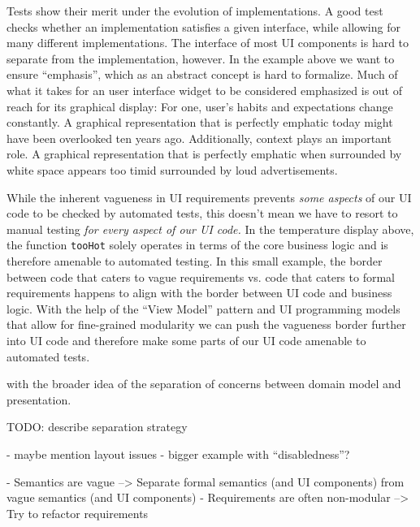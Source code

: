 \documentclass[sigplan,screen]{acmart}
\begin{document}
Tests show their merit under the evolution of implementations. A good
test checks whether an implementation satisfies a given interface,
while allowing for many different implementations. The interface of
most UI components is hard to separate from the implementation,
however. In the example above we want to ensure ``emphasis'', which as
an abstract concept is hard to formalize. Much of what it takes for an
user interface widget to be considered emphasized is out of reach for
its graphical display: For one, user's habits and expectations change
constantly. A graphical representation that is perfectly emphatic
today might have been overlooked ten years ago. Additionally, context
plays an important role. A graphical representation that is perfectly
emphatic when surrounded by white space appears too timid surrounded
by loud advertisements.

While the inherent vagueness in UI requirements prevents \textit{some
  aspects} of our UI code to be checked by automated tests, this
doesn't mean we have to resort to manual testing \textit{for every
  aspect of our UI code.} In the temperature display above, the
function \texttt{tooHot} solely operates in terms of the core business
logic and is therefore amenable to automated testing. In this small
example, the border between code that caters to vague requirements
vs. code that caters to formal requirements happens to align with the
border between UI code and business logic.  With the help of the
``View Model'' pattern and UI programming models that allow for
fine-grained modularity we can push the vagueness border further into
UI code and therefore make some parts of our UI code amenable to
automated tests.

with the broader idea of
the separation of concerns between domain model and presentation.

TODO: describe separation strategy

- maybe mention layout issues
- bigger example with ``disabledness''?

- Semantics are vague
--> Separate formal semantics (and UI components) from vague semantics (and UI components)
- Requirements are often non-modular
--> Try to refactor requirements



\end{document}
